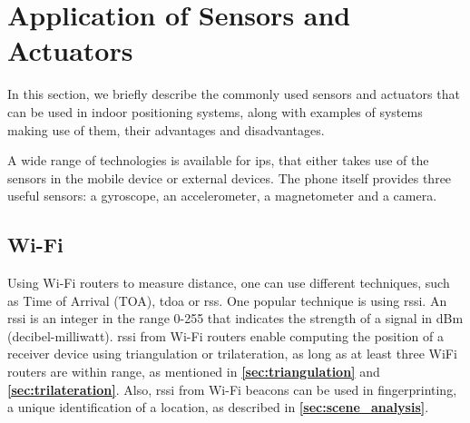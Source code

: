 \section{Application of Sensors and Actuators}\label{sec:actuator_sensor} 

In this section, we briefly describe the commonly used sensors and actuators that can be used in indoor positioning systems, along with examples of systems making use of them, their advantages and disadvantages. 

A wide range of technologies is available for \gls{ips}, that either takes use of the sensors in the mobile device or external devices. The phone itself provides three useful sensors: a gyroscope, an accelerometer, a magnetometer and a camera.







\subsection{Wi-Fi} \label{sec:WiFi}
Using Wi-Fi routers to measure distance, one can use different techniques, such as Time of Arrival (TOA), \gls{tdoa} or \gls{rss}. One popular technique is using \gls{rssi}. An \gls{rssi} is an integer in the range 0-255 that indicates the strength of a signal in dBm (decibel-milliwatt).\cite{RSSIWiFiDistance, RSSIMeasurement}
\gls{rssi} from Wi-Fi routers enable computing the position of a receiver device using triangulation or trilateration, as long as at least three WiFi routers are within range, as mentioned in \textbf{\autoref{sec:triangulation}} and \textbf{\autoref{sec:trilateration}}.
Also, \gls{rssi} from Wi-Fi beacons can be used in fingerprinting, a unique identification of a location, as described in \textbf{\autoref{sec:scene_analysis}}\cite{HabilitationThesis}.

